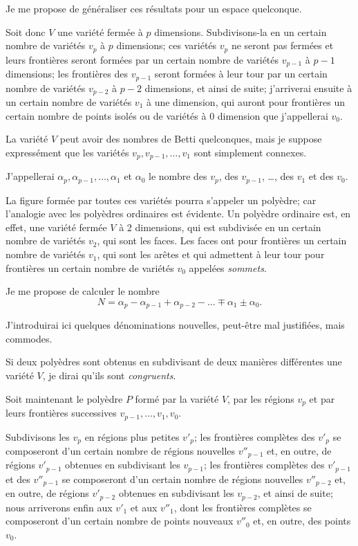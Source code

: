 \documentclass{article}
\begin{document}
Je me propose de généraliser ces résultats pour un espace quelconque.

Soit donc $V$ une variété fermée à $p$ dimensions. Subdivisons-la en un certain nombre de variétés $v_{p}$ à $p$ dimensions; ces variétés $v_{p}$ ne seront pas fermées et leurs frontières seront formées par un certain nombre de variétés $v_{p-1}$ à $p - 1$ dimensions; les frontières des $v_{p-1}$ seront formées à leur tour par un certain nombre de variétés $v_{p-2}$ à $p - 2$ dimensions, et ainsi de suite; j'arriverai ensuite à un certain nombre de variétés $v_{1}$ à une dimension, qui auront pour frontières un certain nombre de points isolés ou de variétés à 0 dimension que j'appellerai $v_{0}$.

La variété $V$ peut avoir des nombres de Betti quelconques, mais je suppose expressément que les variétés $v_{p}, v_{p-1}, \ldots, v_{1}$ sont simplement connexes.

J'appellerai $\alpha_{p}, \alpha_{p-1}, \ldots, \alpha_{1}$ et $\alpha_{0}$ le nombre des $v_{p}$, des $v_{p-1}$, \ldots, des $v_{1}$ et des $v_{0}$.

La figure formée par toutes ces variétés pourra s'appeler un polyèdre; car l'analogie avec les polyèdres ordinaires est évidente. Un polyèdre ordinaire est, en effet, une variété fermée $V$ à 2 dimensions, qui est subdivisée en un certain nombre de variétés $v_{2}$, qui sont les faces. Les faces ont pour frontières un certain nombre de variétés $v_{1}$, qui sont les arêtes et qui admettent à leur tour pour frontières un certain nombre de variétés $v_{0}$ appelées \emph{sommets}.

Je me propose de calculer le nombre
\[ N = \alpha_{p} - \alpha_{p-1} + \alpha_{p-2} - \ldots \mp \alpha_{1} \pm \alpha_{0}. \]

J'introduirai ici quelques dénominations nouvelles, peut-être mal justifiées, mais commodes.

Si deux polyèdres sont obtenus en subdivisant de deux manières différentes une variété $V$, je dirai qu'ils sont \emph{congruents}.

Soit maintenant le polyèdre $P$ formé par la variété $V$, par les régions $v_{p}$ et par leurs frontières successives $v_{p-1}, \ldots, v_{1}, v_{0}$.

Subdivisons les $v_{p}$ en régions plus petites $v'_{p}$; les frontières complètes des $v'_{p}$ se composeront d'un certain nombre de régions nouvelles $v''_{p-1}$ et, en outre, de régions $v'_{p-1}$ obtenues en subdivisant les $v_{p-1}$; les frontières complètes des $v'_{p-1}$ et des $v''_{p-1}$ se composeront d'un certain nombre de régions nouvelles $v''_{p-2}$ et, en outre, de régions $v'_{p-2}$ obtenues en subdivisant les $v_{p-2}$, et ainsi de suite; nous arriverons enfin aux $v'_{1}$ et aux $v''_{1}$, dont les frontières complètes se composeront d'un certain nombre de points nouveaux $v''_{0}$ et, en outre, des points $v_{0}$.
\end{document}
